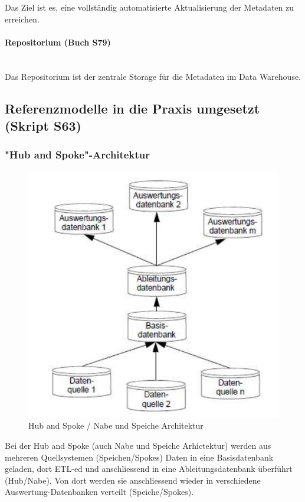 \documentclass[a4paper, 11pt, nofootinbib]{article}
\begin{document}
Das Ziel ist es, eine vollständig automatisierte Aktualisierung der Metadaten zu erreichen.

\paragraph{Repositorium (Buch S79)}\mbox{}\\
Das Repositorium ist der zentrale Storage für die Metadaten im Data Warehouse.

\newpage

\subsection{Referenzmodelle in die Praxis umgesetzt (Skript S63)}
\subsubsection{"Hub and Spoke"-Architektur}
\begin{figure}
	\centering
	\includegraphics[keepaspectratio=true,height=16\baselineskip]{HubAndSpoke.PNG}
	\caption{Hub and Spoke / Nabe und Speiche Architektur}
	\label{label}
\end{figure}

Bei der Hub and Spoke (auch Nabe und Speiche Arhictektur) werden aus mehreren Quellsystemen (Speichen/Spokes) Daten in eine Basisdatenbank geladen, dort ETL-ed und anschliessend in eine Ableitungsdatenbank überführt (Hub/Nabe). Von dort werden sie anschliessend wieder in verschiedene Auswertung-Datenbanken verteilt (Speiche/Spokes).
\end{document}
